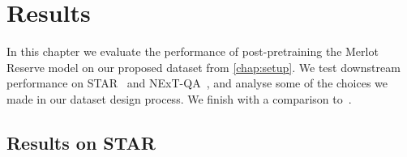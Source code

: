 \chapter{Results}
\label{chap:results}

In this chapter we evaluate the performance of post-pretraining the Merlot
Reserve model on our proposed dataset from \cref{chap:setup}. We test
downstream performance on STAR~\citep{wu2021star} and
NExT-QA~\citep{xiao2021nextqa}, and analyse some of the choices we made in our
dataset design process. We finish with a comparison
to~\citep{bagad2023testoftime}.

\section{Results on STAR}
\label{sec:star_results}

